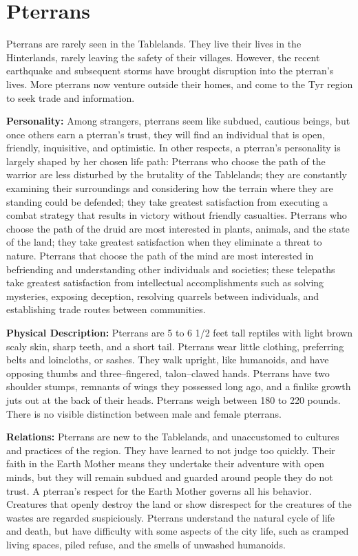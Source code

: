 \documentclass[10pt,a4paper,twocolumn]{d20}
\begin{document}
{\section{Pterrans}

Pterrans are rarely seen in the Tablelands. They live their lives in the Hinterlands, rarely leaving the safety of their villages. However, the recent earthquake and subsequent storms have brought disruption into the pterran’s lives. More pterrans now venture outside their homes, and come to the Tyr region to seek trade and information.

\textbf{Personality:} Among strangers, pterrans seem like subdued, cautious beings, but once others earn a pterran’s trust, they will find an individual that is open, friendly, inquisitive, and optimistic. In other respects, a pterran’s personality is largely shaped by her chosen life path: Pterrans who choose the path of the warrior are less disturbed by the brutality of the Tablelands; they are constantly examining their surroundings and considering how the terrain where they are standing could be defended; they take greatest satisfaction from executing a combat strategy that results in victory without friendly casualties. Pterrans who choose the path of the druid are most interested in plants, animals, and the state of the land; they take greatest satisfaction when they eliminate a threat to nature. Pterrans that choose the path of the mind are most interested in befriending and understanding other individuals and societies; these telepaths take greatest satisfaction from intellectual accomplishments such as solving mysteries, exposing deception, resolving quarrels between individuals, and establishing trade routes between communities.

\textbf{Physical Description:} Pterrans are 5 to 6 1/2 feet tall reptiles with light brown scaly skin, sharp teeth, and a short tail. Pterrans wear little clothing, preferring belts and loincloths, or sashes. They walk upright, like humanoids, and have opposing thumbs and three–fingered, talon–clawed hands. Pterrans have two shoulder stumps, remnants of wings they possessed long ago, and a finlike growth juts out at the back of their heads. Pterrans weigh between 180 to 220 pounds. There is no visible distinction between male and female pterrans.

\textbf{Relations:} Pterrans are new to the Tablelands, and unaccustomed to cultures and practices of the region. They have learned to not judge too quickly. Their faith in the Earth Mother means they undertake their adventure with open minds, but they will remain subdued and guarded around people they do not trust. A pterran’s respect for the Earth Mother governs all his behavior. Creatures that openly destroy the land or show disrespect for the creatures of the wastes are regarded suspiciously. Pterrans understand the natural cycle of life and death, but have difficulty with some aspects of the city life, such as cramped living spaces, piled refuse, and the smells of unwashed humanoids.

}
\end{document}
